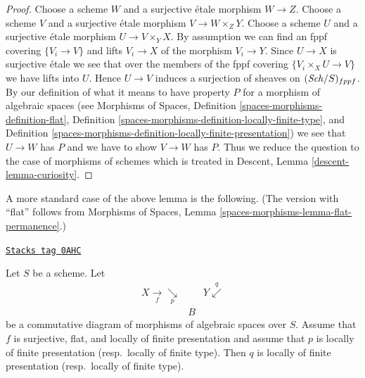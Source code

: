 \begin{proof}
Choose a scheme $W$ and a surjective \'etale morphism $W \to Z$.
Choose a scheme $V$ and a surjective \'etale morphism $V \to W \times_Z Y$.
Choose a scheme $U$ and a surjective \'etale morphism $U \to V \times_Y X$.
By assumption we can find an fppf covering $\{V_i \to V\}$ and
lifts $V_i \to X$ of the morphism $V_i \to Y$. Since $U \to X$ is surjective
\'etale we see that over the members of the fppf covering
$\{V_i \times_X U \to V\}$ we have lifts into $U$. Hence $U \to V$ induces
a surjection of sheaves on $(\mathit{Sch}/S)_{fppf}$.
By our definition of what it means to have property $P$ for a
morphism of algebraic spaces (see
Morphisms of Spaces,
Definition \ref{spaces-morphisms-definition-flat},
Definition \ref{spaces-morphisms-definition-locally-finite-type}, and
Definition \ref{spaces-morphisms-definition-locally-finite-presentation})
we see that $U \to W$ has $P$ and we have to show $V \to W$ has $P$.
Thus we reduce the question to the case of morphisms of schemes
which is treated in
Descent, Lemma \ref{descent-lemma-curiosity}.
\end{proof}

A more standard case of the above lemma is the following.
(The version with ``flat'' follows from
Morphisms of Spaces, Lemma \ref{spaces-morphisms-lemma-flat-permanence}.)

\begin{lemma}
\label{spaces-descent-lemma-flat-finitely-presented-permanence}
\href{https://stacks.math.columbia.edu/tag/0AHC}{\texttt{Stacks tag 0AHC}}

Let $S$ be a scheme. Let
$$
\begin{array}{ccc}X \underset{f}{\longrightarrow}\underset{p}{\searrow} &  & Y \overset{q}{\swarrow} \\  & B & \end{array}
$$
be a commutative diagram of morphisms of algebraic spaces over $S$.
Assume that $f$ is surjective, flat, and locally of finite presentation
and assume that $p$ is locally of finite presentation (resp.\ locally
of finite type). Then $q$ is locally of finite presentation
(resp.\ locally of finite type).
\end{lemma}

